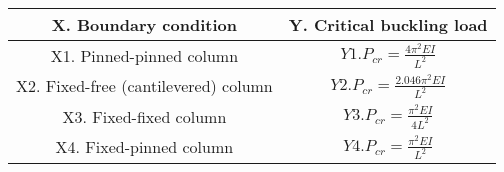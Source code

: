\begin{table}[h!]
\centering
\begin{tabular}{|c|c|}
\hline
\textbf{X. Boundary condition} & \textbf{Y. Critical buckling load} \\ \hline
X1. Pinned-pinned column & $Y1. P_{cr} = \frac{4\pi^2EI}{L^2}$ \\ \hline
X2. Fixed-free (cantilevered) column & $Y2. P_{cr} = \frac{2.046\pi^2EI}{L^2}$ \\ \hline
X3. Fixed-fixed column & $Y3. P_{cr} = \frac{\pi^2EI}{4L^2}$ \\ \hline
X4. Fixed-pinned column & $Y4. P_{cr} = \frac{\pi^2EI}{L^2}$ \\ \hline
\end{tabular}
\end{table}